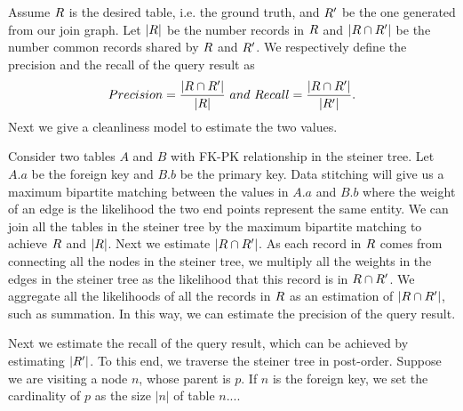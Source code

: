 

Assume $R$ is the desired table, i.e.
the ground truth, and $R'$ be the one generated from our join graph. Let
$|R|$ be the number records in $R$ and $|R\cap R'|$ be the number common
records shared by $R$ and $R'$. We respectively define the precision and the
recall of the query result as
$$Precision=\frac{|R\cap R'|}{|R|}~and~Recall=\frac{|R\cap R'|}{|R'|}.$$
Next we give a cleanliness model to estimate the two values.

Consider two tables $A$ and $B$ with FK-PK relationship in the steiner tree. Let
$A.a$ be the foreign key and $B.b$ be the primary key. Data stitching will give
us a maximum bipartite matching between the values in $A.a$ and $B.b$ where the
weight of an edge is the likelihood the two end points represent the same
entity. We can join all the tables in the steiner tree by the maximum bipartite
matching to achieve $R$ and $|R|$. Next we estimate $|R\cap R'|$. As each
record in $R$ comes from connecting all the nodes in the steiner tree, we
multiply all the weights in the edges in the steiner tree as the likelihood that
this record is in $R\cap R'$. We aggregate all the likelihoods of all the
records in $R$ as an estimation of $|R\cap R'|$, such as summation. In this
way, we can estimate the precision of the query result.


Next we estimate the recall of the query result, which can be achieved by
estimating $|R'|$. To this end, we traverse the steiner tree in post-order.
Suppose we are visiting a node $n$, whose parent is $p$. If $n$ is the foreign
key, we set the cardinality of $p$ as the size $|n|$ of table $n$....


